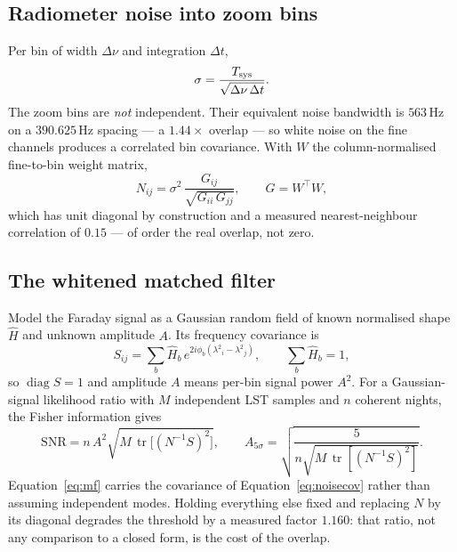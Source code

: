 \documentclass[11pt]{article}
\newcommand{\lamsq}{\ensuremath{\lambda^{2}}}
\begin{document}
\subsection{Radiometer noise into zoom bins}

Per bin of width $\Delta\nu$ and integration $\Delta t$,
\begin{equation}
  \sigma = \frac{T_{\rm sys}}{\sqrt{\Delta\nu\,\Delta t}} .
  \label{eq:radiometer}
\end{equation}
The zoom bins are \emph{not} independent. Their equivalent noise
bandwidth is $563$\,Hz on a $390.625$\,Hz spacing --- a $1.44\times$
overlap --- so white noise on the fine channels produces a correlated bin
covariance. With $W$ the column-normalised fine-to-bin weight matrix,
\begin{equation}
  N_{ij} = \sigma^{2}\,\frac{G_{ij}}{\sqrt{G_{ii}\,G_{jj}}},
  \qquad G = W^{\!\top}W ,
  \label{eq:noisecov}
\end{equation}
which has unit diagonal by construction and a measured
nearest-neighbour correlation of $0.15$ --- of order the real overlap,
not zero.

\subsection{The whitened matched filter}

Model the Faraday signal as a Gaussian random field of known normalised
shape $\hat H$ and unknown amplitude $A$. Its frequency covariance is
\begin{equation}
  S_{ij} = \sum_b \hat H_b\,
  e^{2i\phi_b(\lamsq_i - \lamsq_j)},
  \qquad \sum_b \hat H_b = 1 ,
  \label{eq:sigcov}
\end{equation}
so $\operatorname{diag} S = 1$ and amplitude $A$ means per-bin signal
power $A^2$. For a Gaussian-signal likelihood ratio with $M$ independent
LST samples and $n$ coherent nights, the Fisher information gives
\begin{equation}
  \mathrm{SNR} = n\,A^{2}\sqrt{M\,
  \operatorname{tr}\!\bigl[(N^{-1}S)^2\bigr]},
  \qquad
  A_{5\sigma} = \sqrt{\frac{5}{n\sqrt{M\,
  \operatorname{tr}[(N^{-1}S)^2]}}} .
  \label{eq:mf}
\end{equation}
Equation~\eqref{eq:mf} carries the covariance of
Equation~\eqref{eq:noisecov} rather than assuming independent modes.
Holding everything else fixed and replacing $N$ by its diagonal degrades
the threshold by a measured factor $\mathbf{1.160}$: that ratio, not any
comparison to a closed form, is the cost of the overlap.
\end{document}
